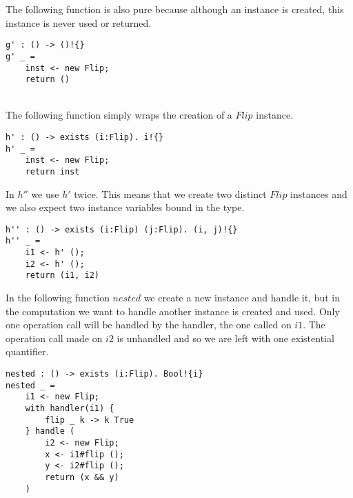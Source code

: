 The following function is also pure because although an instance is created, this instance is never used or returned.
\begin{verbatim}
g' : () -> ()!{}
g' _ =
	inst <- new Flip;
	return ()
\end{verbatim}

\\

The following function simply wraps the creation of a $Flip$ instance.
\begin{verbatim}
h' : () -> exists (i:Flip). i!{}
h' _ =
	inst <- new Flip;
	return inst
\end{verbatim}

In $h''$ we use $h'$ twice. This means that we create two distinct $Flip$ instances and we also expect two instance variables bound in the type.
\begin{verbatim}
h'' : () -> exists (i:Flip) (j:Flip). (i, j)!{}
h'' _ =
	i1 <- h' ();
	i2 <- h' ();
	return (i1, i2)
\end{verbatim}

In the following function $nested$ we create a new instance and handle it, but in the computation we want to handle another instance is created and used. Only one operation call will be handled by the handler, the one called on $i1$. The operation call made on $i2$ is unhandled and so we are left with one existential quantifier.
\begin{verbatim}
nested : () -> exists (i:Flip). Bool!{i}
nested _ =
	i1 <- new Flip;
	with handler(i1) {
		flip _ k -> k True
	} handle (
		i2 <- new Flip;
		x <- i1#flip ();
		y <- i2#flip ();
		return (x && y)
	)
\end{verbatim}
